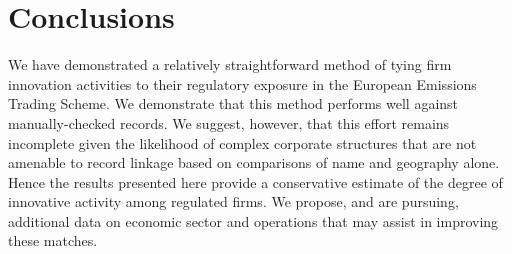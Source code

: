 \documentclass[11pt]{article}
\begin{document}


\section{Conclusions}
\label{sec:conclusions}

We have demonstrated a relatively straightforward method of tying firm
innovation activities to their regulatory exposure in the European
Emissions Trading Scheme. We demonstrate that this method performs
well against manually-checked records. We suggest, however, that this
effort remains incomplete given the likelihood of complex corporate
structures that are not amenable to record linkage based on
comparisons of name and geography alone. Hence the results presented
here provide a conservative estimate of the degree of innovative
activity among regulated firms. We propose, and are pursuing,
additional data on economic sector and operations that may assist in
improving these matches.



\end{document}

